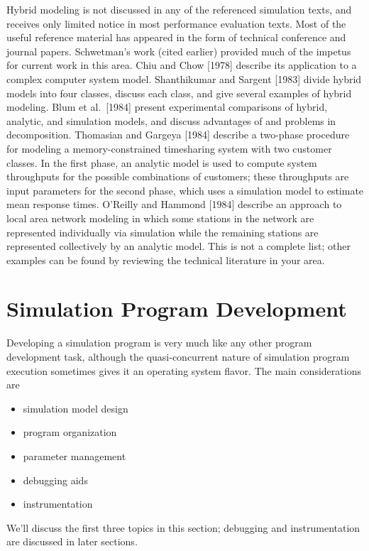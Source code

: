 Hybrid modeling is not discussed in any of the referenced simulation texts,
and receives only limited notice in most performance evaluation texts. Most of
the useful reference material has appeared in the form of technical conference
and journal papers. Schwetman's work (cited earlier) provided much of the
impetus for current work in this area. Chiu and Chow [1978] describe its
application to a complex computer system model. Shanthikumar and Sargent
[1983] divide hybrid models into four classes, discuss each class, and give
several examples of hybrid modeling. Blum et al.\ [1984] present experimental
comparisons of hybrid, analytic, and simulation models, and discuss advantages
of and problems in decomposition. Thomasian and Gargeya [1984] describe a
two-phase procedure for modeling a memory-constrained timesharing system with
 two customer classes. In the first phase, an analytic model is used to compute
system throughputs for the possible combinations of customers; these
throughputs are input parameters for the second phase, which uses a
simulation model to estimate mean response times. O'Reilly and Hammond
[1984] describe an approach to local area network modeling in which some
stations in the network are represented individually via simulation while the
remaining stations are represented collectively by an analytic model. This is
not a complete list; other examples can be found by reviewing the technical
literature in your area.

\section{Simulation Program Development}
\label{sec:simulation-program-development}

Developing a simulation program is very much like any other program
development task, although the quasi-concurrent nature of simulation program
execution sometimes gives it an operating system flavor. The main
considerations are

\begin{itemize}
\item simulation model design
\item program organization
\item parameter management
\item debugging aids
\item instrumentation
\end{itemize}

We'll discuss the first three topics in this section; debugging and
instrumentation are discussed in later sections.

